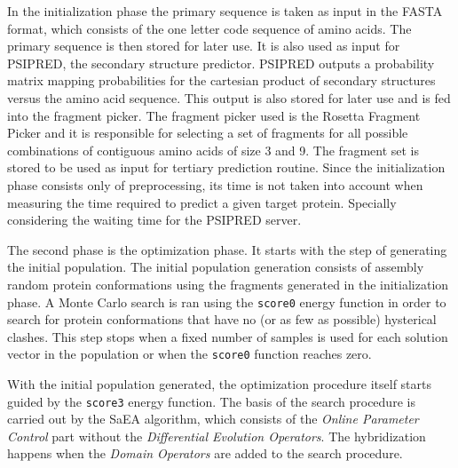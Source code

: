 In the initialization phase the primary sequence is taken as input in the FASTA
format, which consists of the one letter code sequence of amino acids. The
primary sequence is then stored for later use. It is also used as input for
PSIPRED, the secondary structure predictor. PSIPRED outputs a probability
matrix mapping probabilities for the cartesian product of secondary structures
versus the amino acid sequence. This output is also stored for later use and is
fed into the fragment picker.  The fragment picker used is the Rosetta Fragment
Picker and it is responsible for selecting a set of fragments for all possible
combinations of contiguous amino acids of size 3 and 9. The fragment set is
stored to be used as input for tertiary prediction routine. Since the
initialization phase consists only of preprocessing, its time is not taken into
account when measuring the time required to predict a given target protein.
Specially considering the waiting time for the PSIPRED server.

The second phase is the optimization phase.  It starts with the step of
generating the initial population. The initial population generation consists
of assembly random protein conformations using the fragments generated in the
initialization phase. A Monte Carlo search is ran using the \texttt{score0} energy
function in order to search for protein conformations that have no (or as few
as possible) hysterical clashes. This step stops when a fixed number of samples
is used for each solution vector in the population or when the \texttt{score0} function
reaches zero.

With the initial population generated, the optimization procedure itself starts
guided by the \texttt{score3} energy function. The basis of the search procedure is
carried out by the \ac{SaEA} algorithm, which consists of the \textit{Online
Parameter Control} part without the \textit{Differential Evolution Operators}.
The hybridization happens when the \textit{Domain Operators} are added to the
search procedure.

